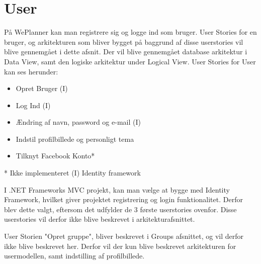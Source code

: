 \section{User}

På WePlanner kan man registrere sig og logge ind som bruger. User Stories for en bruger, og arkitekturen som bliver bygget på baggrund af disse userstories vil blive gennemgået i dette afsnit. Der vil blive gennemgået database arkitektur i Data View, samt den logiske arkitektur under Logical View.
\newline 
User Stories for User kan ses herunder:

\begin{itemize}
    \item Opret Bruger (I)
    \item Log Ind (I)
    \item Ændring af navn, password og e-mail (I)
    \item Indstil profilbillede og personligt tema
    \item Tilknyt Facebook Konto*
\end{itemize}

* Ikke implementeret \newline
(I) Identity framework

I .NET Frameworks MVC projekt, kan man vælge at bygge med Identity Framework, hvilket giver projektet registrering og login funktionalitet. Derfor blev dette valgt, eftersom det udfylder de 3 første userstories ovenfor. Disse userstories vil derfor ikke blive beskrevet i arkitekturafsnittet.

User Storien "Opret gruppe", bliver beskrevet i Groups afsnittet, og vil derfor ikke blive beskrevet her.
Derfor vil der kun blive beskrevet arkitekturen for usermodellen, samt indstilling af profilbillede.



